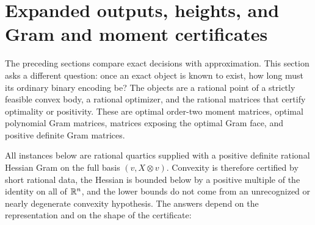 \section{Expanded outputs, heights, and Gram and moment certificates}
\label{sec:heights}

The preceding sections compare exact decisions with approximation. This
section asks a different question: once an exact object is known to exist,
how long must its ordinary binary encoding be? The objects are a rational
point of a strictly feasible convex body, a rational optimizer, and the
rational matrices that certify optimality or positivity. These are optimal
order-two moment matrices, optimal polynomial Gram matrices, matrices
exposing the optimal Gram face, and positive definite Gram matrices.

All instances below are rational quartics supplied with a positive definite
rational Hessian Gram on the full basis $(v,X\otimes v)$. Convexity is
therefore certified by short rational data, the Hessian is bounded below by
a positive multiple of the identity on all of $\mathbb R^n$, and the lower bounds do
not come from
an unrecognized or nearly degenerate convexity hypothesis. The answers
depend on the representation and on the shape of the certificate:
